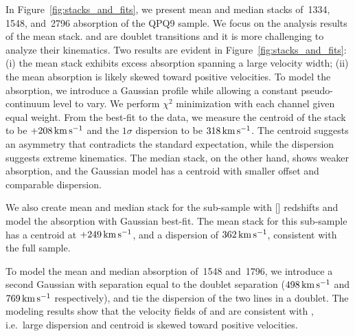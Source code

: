 \documentclass[iop]{emulateapj}
\begin{document}
In Figure~\ref{fig:stacks_and_fits}, we present mean and median stacks of \,1334, 
\,1548, and \,2796 absorption of the QPQ9 sample. We focus on the 
analysis results of the  mean stack.  and  are doublet transitions 
and it is more challenging to analyze their kinematics.
Two results are evident in Figure~\ref{fig:stacks_and_fits}: (i) the mean  stack 
exhibits excess absorption spanning a large velocity width; (ii) the mean absorption is likely 
skewed toward positive velocities. To model the absorption, we introduce a Gaussian profile while 
allowing a constant pseudo-continuum level to vary. We perform $\chi^2$ minimization with each 
channel given equal weight. From the best-fit to the data, we measure the centroid of the 
 stack to be $+208\,{\rm km\,s^{-1}}$ and the $1\sigma$ dispersion to be 
$318\,{\rm km\,s^{-1}}$. The centroid suggests an asymmetry that contradicts the standard 
expectation, while the dispersion suggests extreme kinematics. The median stack, on the other 
hand, shows weaker absorption, and the Gaussian model has a centroid with smaller offset and 
comparable dispersion. 

We also create mean and median stack for the sub-sample with [] redshifts and model the 
absorption with Gaussian best-fit. The  mean stack for this sub-sample has a centroid at 
$+249\,{\rm km\,s^{-1}}$, and a dispersion of $362\,{\rm km\,s^{-1}}$, consistent with the full 
sample. 

To model the mean and median absorption of \,1548 and \,1796, we introduce a  
second Gaussian with separation equal to the doublet separation ($498\,{\rm km\,s^{-1}}$ and 
$769\,{\rm km\,s^{-1}}$ respectively), and tie the dispersion of the two lines in a doublet. The 
modeling results show that the velocity fields of  and  are consistent with 
, i.e.\ large dispersion and centroid is skewed toward positive velocities. 
\end{document}
